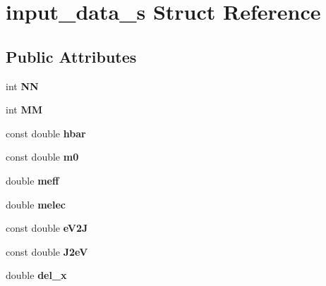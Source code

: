 \hypertarget{structinput__data__s}{\section{input\-\_\-data\-\_\-s Struct Reference}
\label{structinput__data__s}
}
\subsection*{Public Attributes}
\begin{DoxyCompactItemize}
\item 
\hypertarget{structinput__data__s_a54ba418c62a4eb27358c1de8df6d4866}{int {\bfseries N\-N}}\label{structinput__data__s_a54ba418c62a4eb27358c1de8df6d4866}

\item 
\hypertarget{structinput__data__s_ad75e7787676f0f434017f61907f10d27}{int {\bfseries M\-M}}\label{structinput__data__s_ad75e7787676f0f434017f61907f10d27}

\item 
\hypertarget{structinput__data__s_a675d6aadcb6e3df8ff0bb2e9664169c5}{const double {\bfseries hbar}}\label{structinput__data__s_a675d6aadcb6e3df8ff0bb2e9664169c5}

\item 
\hypertarget{structinput__data__s_a4e10036b2ad8b766f265e90afba2c321}{const double {\bfseries m0}}\label{structinput__data__s_a4e10036b2ad8b766f265e90afba2c321}

\item 
\hypertarget{structinput__data__s_a64ff5f89bd00cec9dbc21928294f8a30}{double {\bfseries meff}}\label{structinput__data__s_a64ff5f89bd00cec9dbc21928294f8a30}

\item 
\hypertarget{structinput__data__s_a9b7bd8c5be4ab3e9fe9fc5741a7fc987}{double {\bfseries melec}}\label{structinput__data__s_a9b7bd8c5be4ab3e9fe9fc5741a7fc987}

\item 
\hypertarget{structinput__data__s_ae397df93b4bea315f24fa9c37937eef8}{const double {\bfseries e\-V2\-J}}\label{structinput__data__s_ae397df93b4bea315f24fa9c37937eef8}

\item 
\hypertarget{structinput__data__s_a3a998d6165bc87bf1bb8740faeefae27}{const double {\bfseries J2e\-V}}\label{structinput__data__s_a3a998d6165bc87bf1bb8740faeefae27}

\item 
\hypertarget{structinput__data__s_a9e850c83ad68502ab28efbe6e93de5f5}{double {\bfseries del\-\_\-x}}\label{structinput__data__s_a9e850c83ad68502ab28efbe6e93de5f5}


\end{DoxyCompactItemize}

